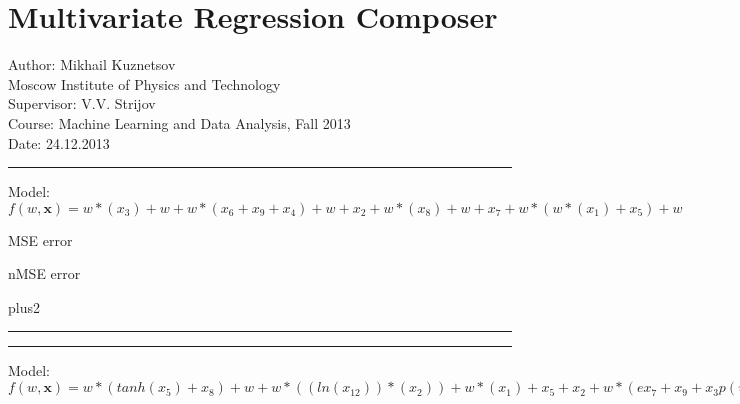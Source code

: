 \documentclass[12pt]{article}
\begin{document}
\section*{Multivariate Regression Composer}
Author: Mikhail Kuznetsov\\
Moscow Institute of Physics and Technology\\
Supervisor: V.V. Strijov\\
Course: Machine Learning and Data Analysis, Fall 2013\\
Date: 24.12.2013\\
\hrule
\vspace{1cm}
Model: $f(w,\mathbf{x})=w*(x_3)+w+w*(x_6+x_9+x_4)+w+x_2+w*(x_8)+w+x_7+w*(w*(x_1)+x_5)+w$

MSE error

nMSE error


\begin{bundle}{plus2}\end{bundle}

\hrule
\vspace{1cm}
\hrule
\vspace{1cm}
Model: $f(w,\mathbf{x})=w*(tanh(x_5)+x_8)+w+w*((ln(x_12))*(x_2))+w*(x_1)+x_5+x_2+w*(ex_7+x_9+x_3p(w*x_7+x_9+x_3))+w$
\end{document}
